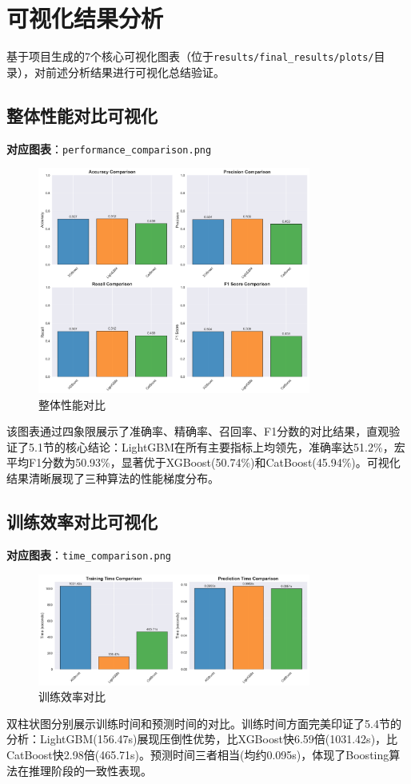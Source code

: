 \documentclass[UTF8]{report}
\theoremstyle{MyLineTheoremStyle} %
\theoremstyle{MyBlockTheoremStyle} %
\theoremstyle{MySubsubsectionStyle} %
\begin{document}
\section{可视化结果分析}
基于项目生成的7个核心可视化图表（位于\texttt{results/final\_results/plots/}目录），对前述分析结果进行可视化总结验证。

\subsection{整体性能对比可视化}
\textbf{对应图表}：\texttt{performance\_comparison.png}
\begin{figure}[H]
    \centering
    \includegraphics[width=0.8\textwidth]{performance_comparison.png}
    \caption{整体性能对比}
\end{figure}
该图表通过四象限展示了准确率、精确率、召回率、F1分数的对比结果，直观验证了5.1节的核心结论：LightGBM在所有主要指标上均领先，准确率达51.2\%，宏平均F1分数为50.93\%，显著优于XGBoost(50.74\%)和CatBoost(45.94\%)。可视化结果清晰展现了三种算法的性能梯度分布。

\subsection{训练效率对比可视化}
\textbf{对应图表}：\texttt{time\_comparison.png}
\begin{figure}[H]
    \centering
    \includegraphics[width=0.8\textwidth]{time_comparison.png}
    \caption{训练效率对比}
\end{figure}
双柱状图分别展示训练时间和预测时间的对比。训练时间方面完美印证了5.4节的分析：LightGBM(156.47s)展现压倒性优势，比XGBoost快6.59倍(1031.42s)，比CatBoost快2.98倍(465.71s)。预测时间三者相当(均约0.095s)，体现了Boosting算法在推理阶段的一致性表现。
\end{document}
